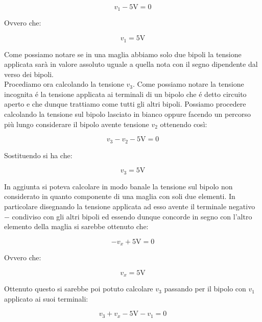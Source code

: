 \documentclass[../main.tex]{subfiles}
\begin{document}
\begin{equation}
	v_1 - \text{5V} = 0
\end{equation}

Ovvero che:

\begin{equation}
	v_1 = \text{5V}
\end{equation}

Come possiamo notare se in una maglia abbiamo solo due bipoli la tensione applicata sarà in valore assoluto uguale a quella nota con il segno dipendente dal verso dei bipoli.\\

Procediamo ora calcolando la tensione $v_3$. Come possiamo notare la tensione incognita é la tensione applicata ai terminali di un bipolo che é detto circuito aperto e che dunque trattiamo come tutti gli altri bipoli.
Possiamo procedere calcolando la tensione sul bipolo lasciato in bianco oppure facendo un percorso più lungo considerare il bipolo avente tensione $v_2$ ottenendo così:

\begin{equation}
	v_3 - v_2 - \text{5V} = 0
\end{equation}

Sostituendo si ha che:

\begin{equation}
	v_3 = \text{5V}
\end{equation}

In aggiunta si poteva calcolare in modo banale la tensione sul bipolo non considerato in quanto componente di una maglia con soli due elementi. In particolare disegnando la tensione applicata ad esso avente il terminale negativo $-$ condiviso con gli altri bipoli ed essendo dunque concorde in segno con l'altro elemento della maglia si sarebbe ottenuto che:

\begin{equation}
	-v_x + \text{5V} = 0
\end{equation}

Ovvero che:

\begin{equation}
	v_x = \text{5V}
\end{equation}

Ottenuto questo si sarebbe poi potuto calcolare $v_3$ passando per il bipolo con $v_1$ applicato ai suoi terminali:

\begin{equation}
	v_3 + v_x - \text{5V} - v_1 = 0
\end{equation}
\end{document}
